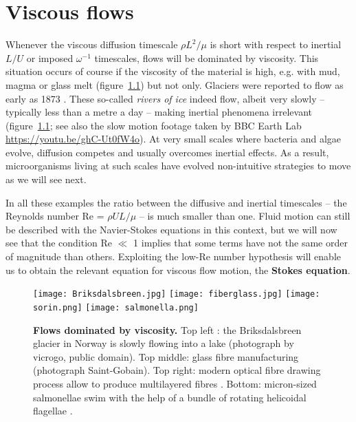 \chapter[Viscous flows]{{\bfseries Viscous} flows}
\label{chap:viscous_flows}
Whenever the viscous diffusion timescale $\rho L^2/\mu$ is short with respect to inertial $L/U$ or imposed $\omega^{-1}$ timescales, flows will be dominated by viscosity. This situation occurs of course if the viscosity of the material is high, e.g. with mud, magma or glass melt (figure~\ref{fig:viscous_flows}) but not only. Glaciers were reported to flow as early as 1873 \citep{Aitken1873}. These so-called \textit{rivers of ice} indeed flow, albeit very slowly -- typically less than a metre a day -- making inertial phenomena irrelevant (figure~\ref{fig:viscous_flows}; see also the slow motion footage taken by BBC Earth Lab \url{https://youtu.be/ghC-Ut0fW4o}). At very small scales where bacteria and algae evolve, diffusion competes and usually overcomes inertial effects. As a result, microorganisms living at such scales have evolved non-intuitive strategies to move as we will see next.

In all these examples the ratio between the diffusive and inertial timescales -- the Reynolds number Re = $\rho U L/\mu$ -- is much smaller than one. Fluid motion can still be described with the Navier-Stokes equations in this context, but we will now see that the condition Re $\ll$ 1 implies that some terms have not the same order of magnitude than others. Exploiting the low-Re number hypothesis will enable us to obtain the relevant equation for viscous flow motion, the \textbf{Stokes equation}.

\begin{figure}[htbp]
\begin{center}
\texttt{[image: Briksdalsbreen.jpg]}
\texttt{[image: fiberglass.jpg]}
\texttt{[image: sorin.png]}
\texttt{[image: salmonella.png]}
\caption{\textbf{Flows dominated by viscosity.} Top left : the Briksdalsbreen glacier in Norway is slowly flowing into a lake (photograph by vicrogo, public domain). Top middle: glass fibre manufacturing (photograph Saint-Gobain). Top right: modern optical fibre drawing process allow to produce multilayered fibres \citep{Abouraddy2007}. Bottom: micron-sized salmonellae swim with the help of a bundle of rotating helicoidal flagellae \citep{Elgeti2015}.}
\label{fig:viscous_flows}
\end{center}
\end{figure}

